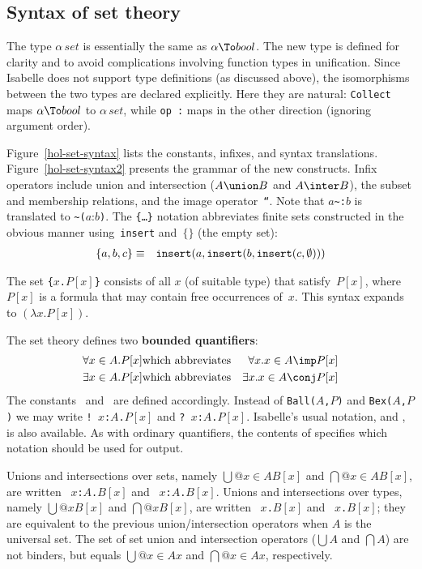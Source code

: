 \subsection{Syntax of set theory}
The type $\alpha\,set$ is essentially the same as $\alpha\To bool$.  The new
type is defined for clarity and to avoid complications involving function
types in unification.  Since Isabelle does not support type definitions (as
discussed above), the isomorphisms between the two types are declared
explicitly.  Here they are natural: {\tt Collect} maps $\alpha\To bool$ to
$\alpha\,set$, while \hbox{\tt op :} maps in the other direction (ignoring
argument order).  

Figure~\ref{hol-set-syntax} lists the constants, infixes, and syntax
translations.  Figure~\ref{hol-set-syntax2} presents the grammar of the new
constructs.  Infix operators include union and intersection ($A\union B$
and $A\inter B$), the subset and membership relations, and the image
operator~{\tt``}.  Note that $a$\verb|~:|$b$ is translated to
\verb|~(|$a$:$b$\verb|)|.  The {\tt\{\ldots\}} notation abbreviates finite
sets constructed in the obvious manner using~{\tt insert} and~$\{\}$ (the
empty set):
\begin{eqnarray*}
 \{a,b,c\} & \equiv & {\tt insert}(a,{\tt insert}(b,{\tt insert}(c,\emptyset)))
\end{eqnarray*}

The set \hbox{\tt\{$x$.$P[x]$\}} consists of all $x$ (of suitable type)
that satisfy~$P[x]$, where $P[x]$ is a formula that may contain free
occurrences of~$x$.  This syntax expands to $(\lambda
x.P[x])$. 

The set theory defines two {\bf bounded quantifiers}:
\begin{eqnarray*}
   \forall x\in A.P[x] &\hbox{which abbreviates}& \forall x. x\in A\imp P[x] \\
   \exists x\in A.P[x] &\hbox{which abbreviates}& \exists x. x\in A\conj P[x]
\end{eqnarray*}
The constants~ and~ are defined
accordingly.  Instead of {\tt Ball($A$,$P$)} and {\tt Bex($A$,$P$)} we may
write
\hbox{\tt !~$x$:$A$.$P[x]$} and \hbox{\tt ?~$x$:$A$.$P[x]$}. 
Isabelle's usual notation,  and , is also
available.  As with
ordinary quantifiers, the contents of  specifies
which notation should be used for output.

Unions and intersections over sets, namely $\bigcup@{x\in A}B[x]$ and
$\bigcap@{x\in A}B[x]$, are written 
~\hbox{\tt$x$:$A$.$B[x]$} and
~\hbox{\tt$x$:$A$.$B[x]$}.  
Unions and intersections over types, namely $\bigcup@x B[x]$ and
$\bigcap@x B[x]$, are written 
~\hbox{\tt$x$.$B[x]$} and
~\hbox{\tt$x$.$B[x]$}; they are equivalent to the previous
union/intersection operators when $A$ is the universal set.
The set of set union and intersection operators ($\bigcup A$ and $\bigcap
A$) are not binders, but equals $\bigcup@{x\in A}x$ and $\bigcap@{x\in
  A}x$, respectively.

